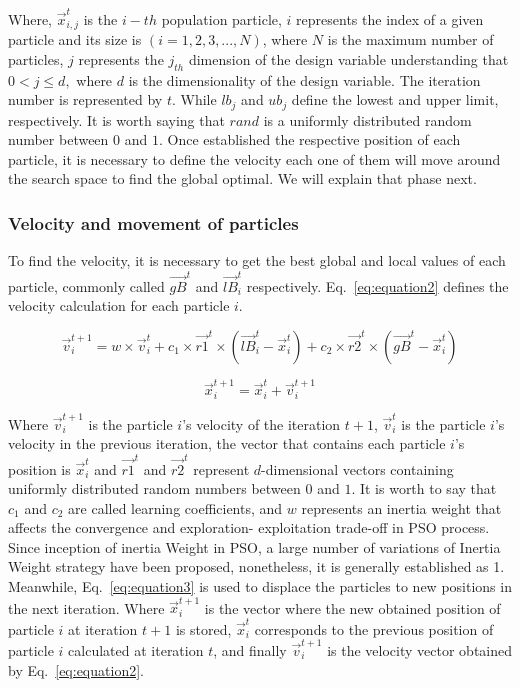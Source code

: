 Where, $\vec{x}_{i,j}^t$ is the $i-th$ population particle, $i$ represents the index of a given particle and its size is $(i=1,2,3,...,N)$, where $N$ is the maximum number of particles, $j$ represents the $j_{th}$ dimension of the design variable understanding that $0<j\leq d,$ where $d$ is the dimensionality of the design variable. The iteration number is represented by $t$. While $lb_j$ and $ub_j$ define the lowest and upper limit, respectively. It is worth saying that $rand$ is a uniformly distributed random number between $0$ and $1$. Once established the respective position of each particle, it is necessary to define the velocity each one of them will move around the search space to find the global optimal. We will explain that phase next.

\subsubsection{Velocity and movement of particles}

To find the velocity, it is necessary to get the best global and local values of each particle, commonly called $\vec{gB}^t$ and $\vec{lB}_i^t$ respectively. Eq.~\ref{eq:equation2} defines the velocity calculation for each particle $i$.

\begin{equation}
\vec{v}_i^{t+1}=w \times \vec{v}_i^{t}+c_{1} \times \vec{r1}^t \times (\vec{lB}_i^t-\vec{x}^{t}_i)+c_{2} \times \vec{r2}^t \times (\vec{gB}^t-\vec{x}^{t}_i)
\label{eq:equation2}
\end{equation}

\begin{equation}
\vec{x}_i^{t+1}=\vec{x}_i^{t}+\vec{v}_i^{t+1}
\label{eq:equation3}
\end{equation}

Where $\vec{v}_i^{t+1}$ is the particle $i$'s velocity of the iteration $t+1$, $\vec{v}_i^{t}$ is the particle $i$'s velocity in the previous iteration, the vector that contains each particle $i$'s position is $\vec{x}_i^{t}$ and $\vec{r1}^t$ and $\vec{r2}^t$ represent $d$-dimensional vectors containing uniformly distributed random numbers between $0$ and $1$. It is worth to say that $c_{1}$ and $c_{2}$ are called learning coefficients, and $w$ represents an inertia weight that affects the convergence and exploration- exploitation trade-off in PSO process. Since inception of inertia Weight in PSO, a large number of variations of Inertia Weight strategy have been proposed, nonetheless, it is generally established as 1. Meanwhile, Eq.~\ref{eq:equation3} is used to displace the particles to new positions in the next iteration. Where $\vec{x}_i^{t+1}$ is the vector where the new obtained position of particle $i$ at iteration $t+1$ is stored, $\vec{x}_i^{t}$ corresponds to the previous position of particle $i$ calculated at iteration $t$, and finally $\vec{v}_i^{t+1}$ is the velocity vector obtained by Eq.~\ref{eq:equation2}.

